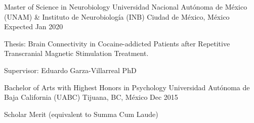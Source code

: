 \begin{cventries}
    \cventry
        {Master of Science in Neurobiology}
        {Universidad Nacional Autónoma de México (UNAM) \& Instituto de
        Neurobiología (INB)}
        {Ciudad de México, México}
        {Expected Jan 2020}
        {
            \begin{cvitems}
                \item {Thesis: Brain Connectivity in Cocaine-addicted Patients after Repetitive Transcranial Magnetic Stimulation Treatment.}
                \item {Supervisor: Eduardo Garza-Villarreal PhD}
            \end{cvitems}
        }
    \cventry
        {Bachelor of Arts with Highest Honors in Psychology}
        {Universidad Autónoma de Baja California (UABC)}
        {Tijuana, BC, México}
        {Dec 2015}
        {
            \begin{cvitems}
                \item {Scholar Merit (equivalent to Summa Cum Laude)}
            \end{cvitems}
        }
\end{cventries}
